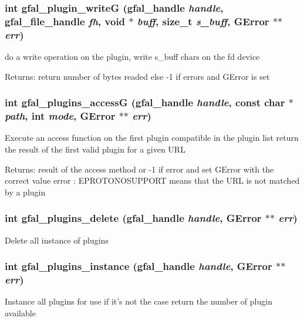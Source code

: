 \subsubsection{\setlength{\rightskip}{0pt plus 5cm}int gfal\_\-plugin\_\-write\-G (gfal\_\-handle {\em handle}, gfal\_\-file\_\-handle {\em fh}, void $\ast$ {\em buff}, size\_\-t {\em s\_\-buff}, GError $\ast$$\ast$ {\em err})}\label{gfal__common__plugin_8h_caaf6298a84f453bb6ddd50c36b6dfd7}


do a write operation on the plugin, write s\_\-buff chars on the fd device \begin{Desc}
\item[Returns:]return number of bytes readed else -1 if errors and GError is set \end{Desc}
\subsubsection{\setlength{\rightskip}{0pt plus 5cm}int gfal\_\-plugins\_\-access\-G (gfal\_\-handle {\em handle}, const char $\ast$ {\em path}, int {\em mode}, GError $\ast$$\ast$ {\em err})}\label{gfal__common__plugin_8h_b59f407ec7865163a60faaa56cbae432}


Execute an access function on the first plugin compatible in the plugin list return the result of the first valid plugin for a given URL \begin{Desc}
\item[Returns:]result of the access method or -1 if error and set GError with the correct value error : EPROTONOSUPPORT means that the URL is not matched by a plugin \end{Desc}
\subsubsection{\setlength{\rightskip}{0pt plus 5cm}int gfal\_\-plugins\_\-delete (gfal\_\-handle {\em handle}, GError $\ast$$\ast$ {\em err})}\label{gfal__common__plugin_8h_592f77dab6aa1a1e206f2cac7bf9ce3e}


Delete all instance of plugins 
\subsubsection{\setlength{\rightskip}{0pt plus 5cm}int gfal\_\-plugins\_\-instance (gfal\_\-handle {\em handle}, GError $\ast$$\ast$ {\em err})\hspace{0.3cm}{\tt  [inline]}}\label{gfal__common__plugin_8h_8027342c27c88b8170ca7cec4f1efc49}


Instance all plugins for use if it's not the case return the number of plugin available 